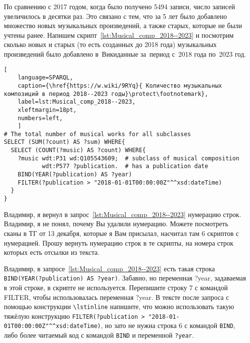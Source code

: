 По сравнению с 2017 годом, когда было получено \num{5494} записи, число записей увеличилось в десятки раз. Это связано с тем, что за 5 лет было добавлено множество новых музыкальных произведений, а также старых, которые не были учтены ранее.
Напишем скрипт~\ref{lst:Musical_comp_2018--2023} и посмотрим сколько новых и старых (то есть созданных до 2018 года) музыкальных произведений было добавлено в~Викиданные за~период с~2018 года по~2023 год.

\begin{lstlisting}[ 
    language=SPARQL,
    caption={\href{https://w.wiki/9RYq}{ Количество музыкальных композиций в период 2018--2023 годы}\protect\footnotemark},
    label=lst:Musical_comp_2018--2023,
    xleftmargin=18pt,
    numbers=left,
    ]
# The total number of musical works for all subclasses 
SELECT (SUM(?count) AS ?sum) WHERE{
  SELECT (COUNT(?music) AS ?count) WHERE{
    ?music wdt:P31 wd:Q105543609;  # subclass of musical composition
           wdt:P577 ?publication.  # has a publication date
    BIND(YEAR(?publication) AS ?year)
    FILTER(?publication > "2018-01-01T00:00:00Z"^^xsd:dateTime)
  }
}
\end{lstlisting}%

\TODO Владимир, я вернул в запрос~\ref{lst:Musical_comp_2018--2023} нумерацию строк. 
Владимир, я не понял, почему Вы удалили нумерацию. 
Можете посмотреть сканы в ТГ от 13 декабря, которые я Вам присылал, насчитал там 6 скриптов с нумерацией. 
Прошу вернуть нумерацию строк в те скрипты, на номера строк которых есть отсылки из текста. 

\TODO Владимир, в запросе~\ref{lst:Musical_comp_2018--2023} 
есть такая строка \lstinline|BIND(YEAR(?publication) AS ?year)|. 
Забавно, но переменная ?year, задаваемая в этой строке, в скрипте не используется. 
Перепишите строку 7 с командой FILTER, чтобы использовалась переменная ?year. 
В тексте после запроса с помощью конструкции \verb|\lstinline| напишите, что 
можно использовать такую тяжёлую конструкцию 
\lstinline|FILTER(?publication > "2018-01-01T00:00:00Z"^^xsd:dateTime)|, 
но зато не нужна строка 6 с командой \lstinline|BIND|, 
либо более читаемый код с командой \lstinline|BIND| и переменной \lstinline|?year|. 



